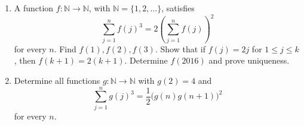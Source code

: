 \begin{enumerate}
\item A function $f:\mathbb N\to\mathbb N$, with $\mathbb N=\{1,2,\ldots\}$, satisfies
\[
\sum_{j=1}^n f(j)^3=2\left(\sum_{j=1}^n f(j)\right)^2
\]
for every $n$. Find $f(1),f(2),f(3)$. Show that if $f(j)=2j$ for $1\le j\le k$, then $f(k+1)=2(k+1)$. Determine $f(2016)$ and prove uniqueness.
\item Determine all functions $g:\mathbb N\to\mathbb N$ with $g(2)=4$ and
\[
\sum_{j=1}^n g(j)^3=\dfrac{1}{2}\bigl(g(n)g(n+1)\bigr)^2
\]
for every $n$.
\end{enumerate}
